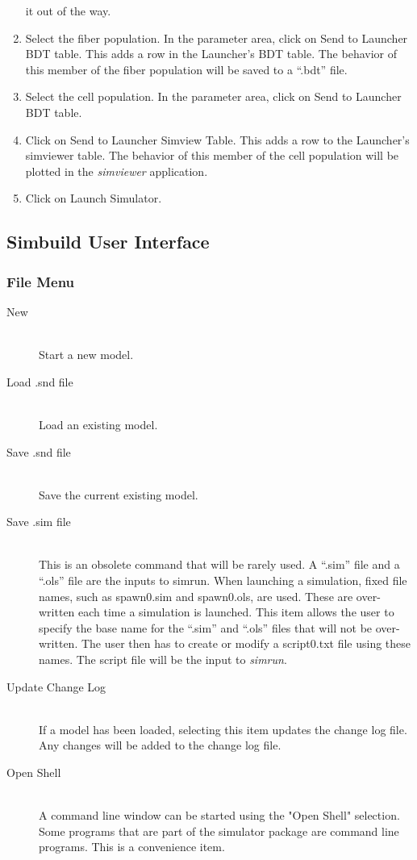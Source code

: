 \documentclass[12pt,openany,oneside]{book}
\newcommand{\prog}[1]{\textit{{#1}}}
\newcommand{\ext}[1]{{{``.#1''}}}
\begin{document}
\begin{enumerate}
it out of the way.
   \item Select the fiber population. In the parameter area, click on Send to Launcher
      BDT table. This adds a row in the Launcher's BDT table. The behavior of this
      member of the fiber population will be saved to a \ext{bdt} file.
   \item Select the cell population. In the parameter area, click on Send to Launcher
      BDT table.
   \item Click on Send to Launcher Simview Table. This adds a row to the Launcher's
      simviewer table. The behavior of this member of the cell population will be 
      plotted in the \prog{simviewer} application.
   \item Click on Launch Simulator.
\end{enumerate}


\subsection{Simbuild User Interface}
\subsubsection{File Menu}
\label{File Menu}
\begin{description}
   \item [New] \hfill \\ 
      Start a new model.
   \item [Load .snd file] \hfill \\ 
      Load an existing model.
   \item [Save .snd file] \hfill \\ 
      Save the current existing model.
   \item [Save .sim file] \hfill \\ 
      This is an obsolete command that will be rarely used.
      A \ext{sim} file and a \ext{ols} file are the inputs to simrun. 
      When launching a simulation, fixed file names, such as spawn0.sim and spawn0.ols, 
      are used. These are over-written each time a simulation is launched. 
      This item allows the user to specify the base name for the \ext{sim}
      and \ext{ols} files that will not be over-written. The user then has to
      create or modify a script0.txt file using these names.
      The script file will be the input to \prog{simrun}.
   \item [Update Change Log] \hfill \\
      If a model has been loaded, selecting this item updates the change log file. 
      Any changes will be added to the change log file.
   \item [Open Shell] \hfill \\
      A command line window can be started using the "Open Shell" selection. 
      Some programs that are part of the simulator package are command 
      line programs. This is a convenience item.
\end{description}
\end{document}
